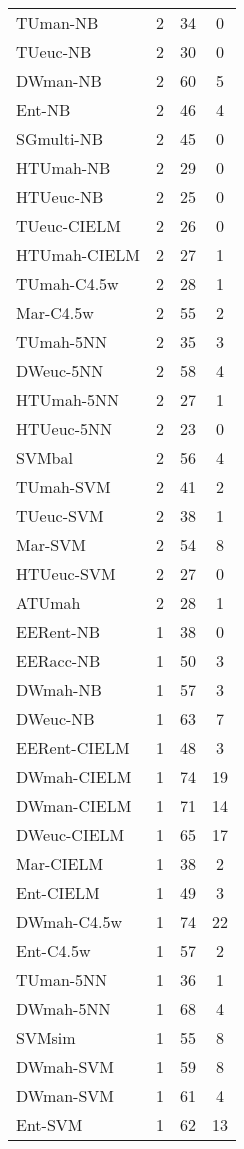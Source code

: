 \begin{table}[h]
\begin{center}
{\begin{tabular}{lccc}
TUman-NB   & 2 & 34 & 0 \\
TUeuc-NB   & 2 & 30 & 0 \\
DWman-NB   & 2 & 60 & 5 \\
Ent-NB     & 2 & 46 & 4 \\
SGmulti-NB & 2 & 45 & 0 \\
HTUmah-NB  & 2 & 29 & 0 \\
HTUeuc-NB  & 2 & 25 & 0 \\
TUeuc-CIELM & 2 & 26 & 0 \\
HTUmah-CIELM & 2 & 27 & 1 \\
TUmah-C4.5w & 2 & 28 & 1 \\
Mar-C4.5w  & 2 & 55 & 2 \\
TUmah-5NN  & 2 & 35 & 3 \\
DWeuc-5NN  & 2 & 58 & 4 \\
HTUmah-5NN & 2 & 27 & 1 \\
HTUeuc-5NN & 2 & 23 & 0 \\
SVMbal     & 2 & 56 & 4 \\
TUmah-SVM  & 2 & 41 & 2 \\
TUeuc-SVM  & 2 & 38 & 1 \\
Mar-SVM    & 2 & 54 & 8 \\
HTUeuc-SVM & 2 & 27 & 0 \\
ATUmah     & 2 & 28 & 1 \\
EERent-NB  & 1 & 38 & 0 \\
EERacc-NB  & 1 & 50 & 3 \\
DWmah-NB   & 1 & 57 & 3 \\
DWeuc-NB   & 1 & 63 & 7 \\
EERent-CIELM & 1 & 48 & 3 \\
DWmah-CIELM & 1 & 74 & 19 \\
DWman-CIELM & 1 & 71 & 14 \\
DWeuc-CIELM & 1 & 65 & 17 \\
Mar-CIELM  & 1 & 38 & 2 \\
Ent-CIELM  & 1 & 49 & 3 \\
DWmah-C4.5w & 1 & 74 & 22 \\
Ent-C4.5w  & 1 & 57 & 2 \\
TUman-5NN  & 1 & 36 & 1 \\
DWmah-5NN  & 1 & 68 & 4 \\
SVMsim     & 1 & 55 & 8 \\
DWmah-SVM  & 1 & 59 & 8 \\
DWman-SVM  & 1 & 61 & 4 \\
Ent-SVM    & 1 & 62 & 13 \\

\end{tabular}}
\end{center}
\end{table}
